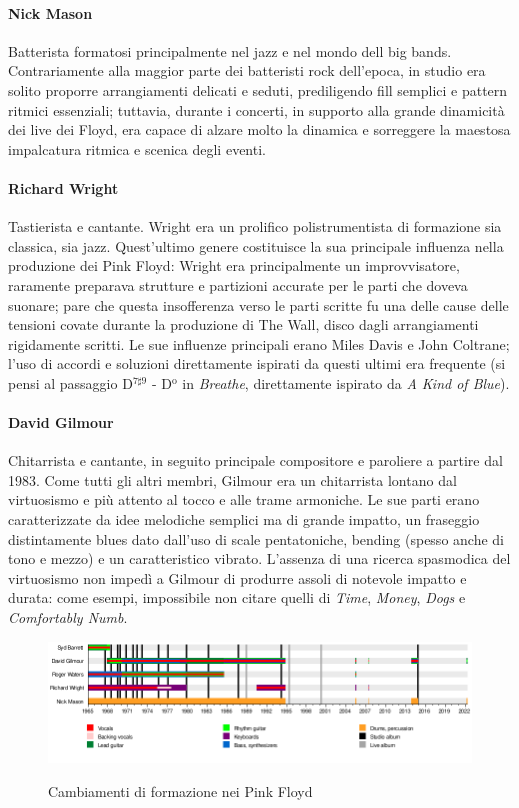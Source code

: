 \documentclass[class=book, crop=false, oneside, 12pt]{standalone}
\begin{document}
    \paragraph{Nick Mason}
    Batterista formatosi principalmente nel jazz e nel mondo dell big bands. Contrariamente alla maggior parte dei batteristi rock dell'epoca, in studio era solito proporre arrangiamenti delicati e seduti, prediligendo fill semplici e pattern ritmici essenziali; tuttavia, durante i concerti, in supporto alla grande dinamicità dei live dei Floyd, era capace di alzare molto la dinamica e sorreggere la maestosa impalcatura ritmica e scenica degli eventi.
    \paragraph{Richard Wright}
    Tastierista e cantante. Wright era un prolifico polistrumentista di formazione sia classica, sia jazz. Quest'ultimo genere costituisce la sua principale influenza nella produzione dei Pink Floyd: Wright era principalmente un improvvisatore, raramente preparava strutture e partizioni accurate per le parti che doveva suonare; pare che questa insofferenza verso le parti scritte fu una delle cause delle tensioni covate durante la produzione di The Wall, disco dagli arrangiamenti rigidamente scritti. Le sue influenze principali erano Miles Davis e John Coltrane; l'uso di accordi e soluzioni direttamente ispirati da questi ultimi era frequente (si pensi al passaggio D\(^{7 \sharp 9}\) - D\(^\textrm{o}\) in \emph{Breathe}, direttamente ispirato da \emph{A Kind of Blue}). 
    \paragraph{David Gilmour}
    Chitarrista e cantante, in seguito principale compositore e paroliere a partire dal 1983. Come tutti gli altri membri, Gilmour era un chitarrista lontano dal virtuosismo e più attento al tocco e alle trame armoniche. Le sue parti erano caratterizzate da idee melodiche semplici ma di grande impatto, un fraseggio distintamente blues dato dall'uso di scale pentatoniche, bending (spesso anche di tono e mezzo) e un caratteristico vibrato. L'assenza di una ricerca spasmodica del virtuosismo non impedì a Gilmour di produrre assoli di notevole impatto e durata: come esempi, impossibile non citare quelli di \emph{Time}, \emph{Money}, \emph{Dogs} e \emph{Comfortably Numb}.

    \begin{figure}[H]
        \includegraphics[keepaspectratio, width=\textwidth]{pinkfloyd-timeline.png}
        \label{fig:01-pinkfloyd-timeline}
        \caption{Cambiamenti di formazione nei Pink Floyd}
    \end{figure}
    
\end{document}
